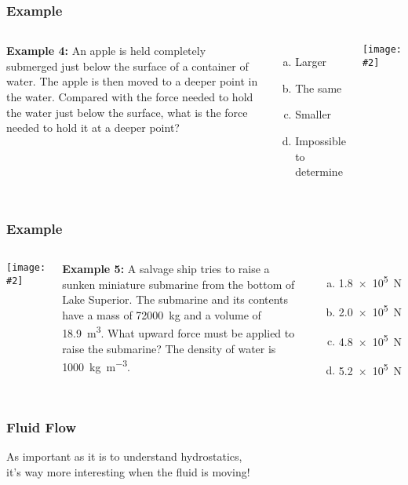 \documentclass[12pt,aspectratio=169]{beamer}
\newcommand{\pic}[2]{\texttt{[image: \#2]}}
\begin{document}
\begin{frame}
  \frametitle{Example}
  \begin{columns}

    \textbf{Example 4:} An apple is held completely submerged just below the
    surface of a container of water. The apple is then moved to a deeper point
    in the water. Compared with the force needed to hold the water just below
    the surface, what is the force needed to hold it at a deeper point?
    \begin{enumerate}[(a)]
    \item Larger
    \item The same
    \item Smaller
    \item Impossible to determine
    \end{enumerate}

    \pic{1}{apple.jpg}
  \end{columns}
\end{frame}



\begin{frame}
  \frametitle{Example}

  \begin{columns}

    \pic{1}{hpa_b.jpg}

    \textbf{Example 5:} A salvage ship tries to raise a sunken miniature
    submarine from the bottom of Lake Superior. The submarine and its contents
    have a mass of \SI{72000}{\kilo\gram} and a volume of \SI{18.9}{\metre^3}.
    What upward force must be applied to raise the submarine? The density of
    water is \SI{1000}{\kilo\gram\per\metre^3}.
    \begin{enumerate}[(a)]
    \item\SI{1.8e5}{\newton}
    \item\SI{2.0e5}{\newton}
    \item\SI{4.8e5}{\newton}
    \item\SI{5.2e5}{\newton}
    \end{enumerate}
  \end{columns}
\end{frame}



\begin{frame}
  \frametitle{Fluid Flow}

  \begin{center}
    As important as it is to understand hydrostatics,\\
    it's way more interesting when the fluid is moving!
  \end{center}
\end{frame}
\end{document}

